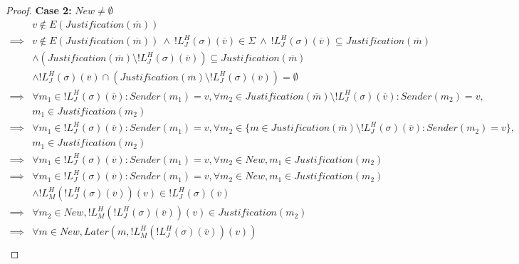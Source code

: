 \begin{proof}
\textbf{Case 2:} $New \neq \emptyset$
\begin{align}
          &v \notin E(Justification(\overline{m})) \\
  \implies&v \notin E(Justification(\overline{m})) ~\land~ !L^H_J(\sigma)(\overline{v}) \in \Sigma ~\land~ !L^H_J(\sigma)(\overline{v}) \subseteq Justification(\overline{m}) \\
          &\land (Justification(\overline{m}) \setminus !L^H_J(\sigma)(\overline{v})) \subseteq Justification(\overline{m}) \\
          &\land !L^H_J(\sigma)(\overline{v}) \cap (Justification(\overline{m}) \setminus !L^H_J(\sigma)(\overline{v})) = \emptyset \\
  \implies&\forall m_1 \in !L^H_J(\sigma)(\overline{v}) : Sender(m_1) = v, \forall m_2 \in Justification(\overline{m}) \setminus !L^H_J(\sigma)(\overline{v}) : Sender(m_2) = v, \\
          &m_1 \in Justification(m_2) \\
  \implies&\forall m_1 \in !L^H_J(\sigma)(\overline{v}) : Sender(m_1) = v, \forall m_2 \in \{m \in Justification(\overline{m}) \setminus !L^H_J(\sigma)(\overline{v}) : Sender(m_2) = v\}, \\
          &m_1 \in Justification(m_2) \\
  \implies&\forall m_1 \in !L^H_J(\sigma)(\overline{v}) : Sender(m_1) = v, \forall m_2 \in New, m_1 \in Justification(m_2) \\
  \implies&\forall m_1 \in !L^H_J(\sigma)(\overline{v}) : Sender(m_1) = v, \forall m_2 \in New, m_1 \in Justification(m_2) \\
          &\land !L^H_M(!L^H_J(\sigma)(\overline{v}))(v) \in !L^H_J(\sigma)(\overline{v}) \\
  \implies&\forall m_2 \in New, !L^H_M(!L^H_J(\sigma)(\overline{v}))(v) \in Justification(m_2) \\
  \implies&\forall m \in New, Later(m, !L^H_M(!L^H_J(\sigma)(\overline{v}))(v)) \\
\end{align}


\end{proof}
